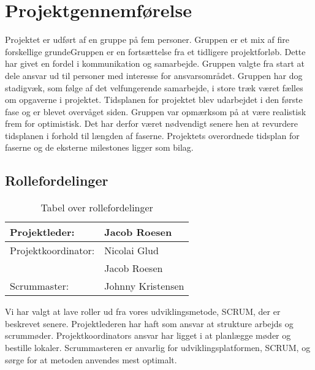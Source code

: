 \section{Projektgennemførelse}
Projektet er udført af en gruppe på fem personer. Gruppen er et mix af fire forskellige grundeGruppen er en fortsættelse fra et tidligere projektforløb. Dette har givet en fordel i kommunikation og samarbejde. Gruppen valgte fra start at dele ansvar ud til personer med interesse for ansvarsområdet. Gruppen har dog stadigvæk, som følge af det velfungerende samarbejde, i store træk været fælles om opgaverne i projektet.
Tidsplanen for projektet blev udarbejdet i den første fase og er blevet overvåget siden. Gruppen var opmærksom på at være realistisk frem for optimistisk. Det har derfor været nødvendigt senere hen at revurdere tidsplanen i forhold til længden af faserne.
Projektets overordnede tidsplan for faserne og de eksterne milestones ligger som bilag.
\subsection{Rollefordelinger}
\begin{table}[H]
\centering
\begin{tabular}{|l|l|} \hline
Projektleder: &Jacob Roesen\\\hline
Projektkoordinator: &Nicolai Glud\\
	&Jacob Roesen\\\hline
Scrummaster: &Johnny Kristensen\\\hline
\end{tabular}
\caption{Tabel over rollefordelinger}
\label{table:roller}
\end{table}
Vi har valgt at lave roller ud fra vores udviklingsmetode, SCRUM, der er beskrevet senere. Projektlederen har haft som ansvar at strukture arbejds og scrummøder. Projektkoordinators ansvar har ligget i at planlægge møder og bestille lokaler. Scrummasteren er anvarlig for udviklingsplatformen, SCRUM, og sørge for at metoden anvendes mest optimalt. 